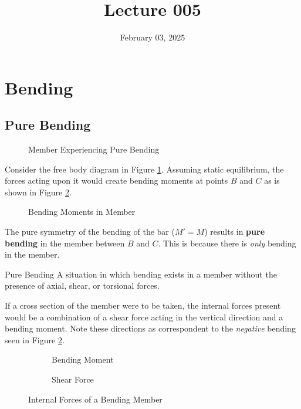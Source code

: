\documentclass[12pt]{article}
\title{Lecture 005}
\date{February 03, 2025}
\begin{document}
\newpage
\section{Bending}
\label{sec:bending}

\subsection{Pure Bending}
\label{ssec:pureBending}

\begin{figure}[H]
  \centering
  
  \caption{Member Experiencing Pure Bending}
  \label{fig:057}
\end{figure}

Consider the free body diagram in Figure \ref{fig:057}. Assuming static equilibrium, the forces acting upon it would create bending moments at points $B$ and $C$ as is shown in Figure \ref{fig:058}.

\begin{figure}[H]
  \centering
  
  \caption{Bending Moments in Member}
  \label{fig:058}
\end{figure}

The pure symmetry of the bending of the bar ($M' = M$) results in \textbf{pure bending} in the member between $B$ and $C$. This is because there is \textit{only} bending in the member.

\begin{definition}{Pure Bending}
  A situation in which bending exists in a member without the presence of axial, shear, or torsional forces.
\end{definition}

If a cross section of the member were to be taken, the internal forces present would be a combination of a shear force acting in the vertical direction and a bending moment. Note these directions as correspondent to the \textit{negative} bending seen in Figure \ref{fig:058}.
\begin{figure}[H]
  \centering
  \begin{subfigure}[H]{0.45\textwidth}
    \centering
    
    \caption{Bending Moment}
    \label{fig:060}
  \end{subfigure}
  \begin{subfigure}[H]{0.45\textwidth}
    \centering
    
    \caption{Shear Force}
    \label{fig:059}
  \end{subfigure}
  \caption{Internal Forces of a Bending Member}
  \label{fig:internalForcesOfABendingMember}
\end{figure}
\end{document}
